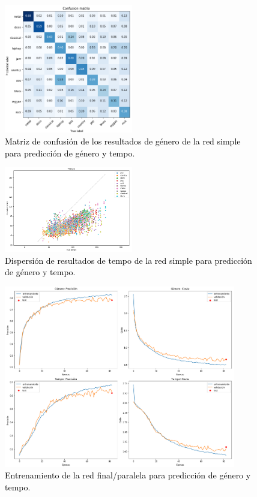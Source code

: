 \begin{figure}[!ht]
  \centering
  \includegraphics[width=0.5\textwidth]{Figures/confusion_simple.png}
  \caption{\textcolor{black}{Matriz de confusión de los resultados de género de la red simple para predicción de género y tempo}.}
  \label{Fig:confusion_simple}
\end{figure}

\begin{figure}[!ht]
  \centering
  \includegraphics[width=0.5\textwidth]{Figures/scatter_simple.png}
  \caption{\textcolor{black}{Dispersión de resultados de tempo de la red simple para predicción de género y tempo}.}
  \label{Fig:scatter_simple}
\end{figure}

\begin{figure}[!ht]
  \centering
  \includegraphics[width=0.9\textwidth]{Figures/entrenamiento_final.png}
  \caption{\textcolor{black}{Entrenamiento de la red final/paralela para predicción de género y tempo}.}
  \label{Fig:entrenamiento_final}
\end{figure}

